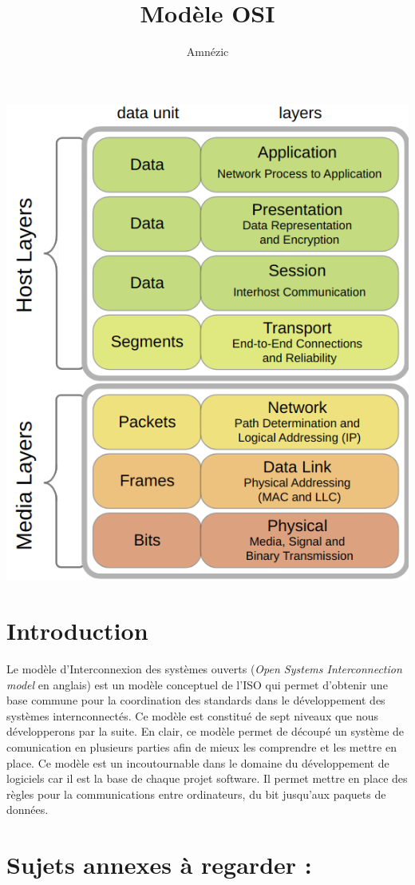 \documentclass{article}
\author{Amnézic}
\date{}
\title{Modèle OSI}
\begin{document}
\maketitle
\includegraphics[scale=0.5]{OSI_model.png}
\newpage
\tableofcontents
\newpage

\section{Introduction}
Le modèle d'Interconnexion des systèmes ouverts (\textit{Open Systems Interconnection model} en anglais) est un modèle conceptuel de l'ISO qui permet d'obtenir une base commune pour la coordination des standards dans le développement des systèmes internconnectés. Ce modèle est constitué de sept niveaux que nous développerons par la suite. En clair, ce modèle permet de découpé un système de comunication en plusieurs parties afin de mieux les comprendre et les mettre en place. Ce modèle est un incoutournable dans le domaine du développement de logiciels car il est la base de chaque projet software. Il permet mettre en place des règles pour la communications entre ordinateurs, du bit jusqu'aux paquets de données.


\section{Sujets annexes à regarder :}
\end{document}
